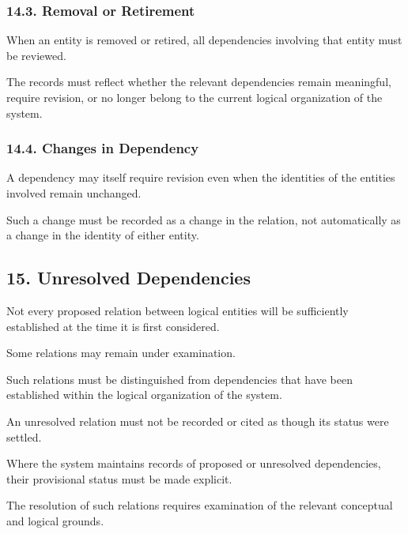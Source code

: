 \subsubsection*{14.3. Removal or Retirement}

When an entity is removed
or retired, all dependencies
involving that entity must
be reviewed.

The records must reflect
whether the relevant
dependencies remain meaningful,
require revision, or no
longer belong to the
current logical organization
of the system.

\subsubsection*{14.4. Changes in Dependency}

A dependency may itself
require revision even when
the identities of the
entities involved remain
unchanged.

Such a change must be
recorded as a change in
the relation, not automatically
as a change in the identity
of either entity.


\subsection*{15. Unresolved Dependencies}

Not every proposed relation
between logical entities
will be sufficiently established
at the time it is first
considered.

Some relations may remain
under examination.

Such relations must be
distinguished from dependencies
that have been established
within the logical organization
of the system.

An unresolved relation
must not be recorded
or cited as though its
status were settled.

Where the system maintains
records of proposed or
unresolved dependencies,
their provisional status
must be made explicit.

The resolution of such
relations requires examination
of the relevant conceptual
and logical grounds.


